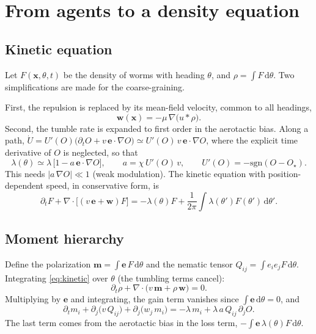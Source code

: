 \documentclass[11pt,a4paper]{article}
\newcommand{\dd}{\mathrm{d}}
\newcommand{\vect}[1]{\bm{#1}}
\newcommand{\Ostar}{O_{\star}}
\begin{document}
\section{From agents to a density equation}
\label{sec:coarse}

\subsection{Kinetic equation}
Let $F(\vect{x},\theta,t)$ be the density of worms with heading $\theta$, and $\rho=\int F\,\dd\theta$. Two simplifications are made for the coarse-graining.

First, the repulsion is replaced by its mean-field velocity, common to all headings,
\begin{equation}
\vect{w}(\vect{x})=-\mu\,\nabla\big(u*\rho\big).
\end{equation}
Second, the tumble rate is expanded to first order in the aerotactic bias. Along a path, $\dot U=U'(O)\big(\partial_tO+v\,\vect{e}\cdot\nabla O\big)\simeq U'(O)\,v\,\vect{e}\cdot\nabla O$, where the explicit time derivative of $O$ is neglected, so that
\begin{equation}
\lambda(\theta)\simeq\lambda\,\big[1-a\,\vect{e}\cdot\nabla O\big],\qquad a=\chi\,U'(O)\,v,\qquad U'(O)=-\mathrm{sgn}(O-\Ostar).
\end{equation}
This needs $|a\,\nabla O|\ll1$ (weak modulation). The kinetic equation with position-dependent speed, in conservative form, is
\begin{equation}
\partial_tF+\nabla\!\cdot\!\big[(v\,\vect{e}+\vect{w})F\big]=-\lambda(\theta)F+\frac{1}{2\pi}\int\lambda(\theta')F(\theta')\,\dd\theta' .
\label{eq:kinetic}
\end{equation}

\subsection{Moment hierarchy}
Define the polarization $\vect{m}=\int\vect{e}\,F\,\dd\theta$ and the nematic tensor $Q_{ij}=\int e_ie_jF\,\dd\theta$. Integrating \eqref{eq:kinetic} over $\theta$ (the tumbling terms cancel):
\begin{equation}
\partial_t\rho+\nabla\!\cdot\!\big(v\,\vect{m}+\rho\,\vect{w}\big)=0 .
\label{eq:cont}
\end{equation}
Multiplying by $\vect{e}$ and integrating, the gain term vanishes since $\int\vect{e}\,\dd\theta=0$, and
\begin{equation}
\partial_tm_i+\partial_j\big(v\,Q_{ij}\big)+\partial_j\big(w_j\,m_i\big)=-\lambda\,m_i+\lambda\,a\,Q_{ij}\,\partial_jO .
\label{eq:mom}
\end{equation}
The last term comes from the aerotactic bias in the loss term, $-\int\vect{e}\,\lambda(\theta)F\,\dd\theta$.
\end{document}
